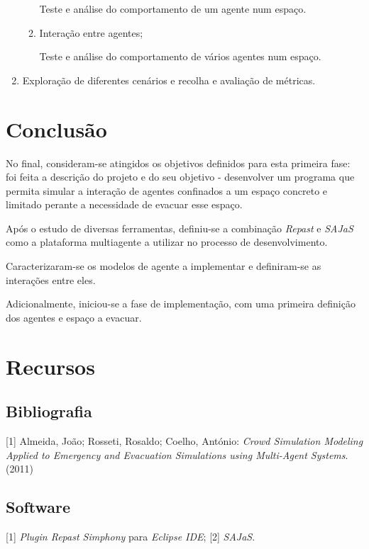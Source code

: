 \documentclass[12pt]{article}
\begin{document}
\begin{titlepage}
\begin{enumerate}
\begin{enumerate}
	 	Teste e análise do comportamento de um agente num espaço.
		\item Interação entre agentes;
		
		Teste e análise do comportamento de vários agentes num espaço. 
	\end{enumerate}
	\item Exploração de diferentes cenários e recolha e avaliação de métricas.
\end{enumerate}


\section{Conclusão}

No final, consideram-se atingidos os objetivos definidos para esta primeira fase: foi feita a descrição do projeto e do seu objetivo - desenvolver um programa que permita simular a interação de agentes confinados a um espaço concreto e limitado perante a necessidade de evacuar esse espaço.

Após o estudo de diversas ferramentas, definiu-se a combinação \textit{Repast} e \textit{SAJaS} como a plataforma multiagente a utilizar no processo de  desenvolvimento.

Caracterizaram-se os modelos de agente a implementar e definiram-se as interações entre eles.

Adicionalmente, iniciou-se a fase de implementação, com uma primeira definição dos agentes e espaço a evacuar.



\section{Recursos}
\subsection{Bibliografia}
[1] Almeida, João; Rosseti, Rosaldo; Coelho, António: \textit{Crowd Simulation Modeling Applied to Emergency and Evacuation Simulations using Multi-Agent Systems}. (2011)

\subsection{Software}
[1] \textit{Plugin Repast Simphony} para \textit{Eclipse IDE};
[2] \textit{SAJaS}.

\end{titlepage}
\end{document}
